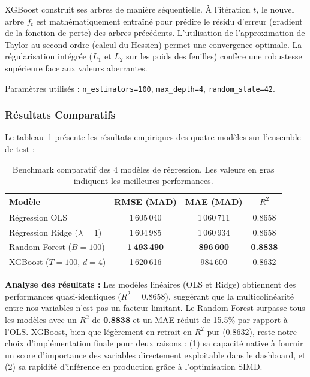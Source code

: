 \documentclass[11pt,a4paper,twoside]{report}
\begin{document}
XGBoost construit ses arbres de manière séquentielle. À l'itération $t$, le nouvel arbre $f_t$ est mathématiquement entraîné pour prédire le résidu d'erreur (gradient de la fonction de perte) des arbres précédents. L'utilisation de l'approximation de Taylor au second ordre (calcul du Hessien) permet une convergence optimale. La régularisation intégrée ($L_1$ et $L_2$ sur les poids des feuilles) confère une robustesse supérieure face aux valeurs aberrantes.

Paramètres utilisés : \texttt{n\_estimators=100}, \texttt{max\_depth=4}, \texttt{random\_state=42}.

\subsubsection{Résultats Comparatifs}

Le tableau~\ref{tab:reg_benchmark} présente les résultats empiriques des quatre modèles sur l'ensemble de test :

\begin{table}[h]
\centering
\begin{tabular}{|l|c|c|c|}
\hline
\textbf{Modèle} & \textbf{RMSE (MAD)} & \textbf{MAE (MAD)} & \textbf{$R^2$} \\ \hline
Régression OLS & 1\,605\,040 & 1\,060\,711 & 0.8658 \\ \hline
Régression Ridge ($\lambda=1$) & 1\,604\,985 & 1\,060\,934 & 0.8658 \\ \hline
Random Forest ($B=100$) & \textbf{1\,493\,490} & \textbf{896\,600} & \textbf{0.8838} \\ \hline
XGBoost ($T=100$, $d=4$) & 1\,620\,616 & 984\,600 & 0.8632 \\ \hline
\end{tabular}
\caption{Benchmark comparatif des 4 modèles de régression. Les valeurs en gras indiquent les meilleures performances.}
\label{tab:reg_benchmark}
\end{table}

\textbf{Analyse des résultats :} Les modèles linéaires (OLS et Ridge) obtiennent des performances quasi-identiques ($R^2 = 0.8658$), suggérant que la multicolinéarité entre nos variables n'est pas un facteur limitant. Le Random Forest surpasse tous les modèles avec un $R^2$ de \textbf{0.8838} et un MAE réduit de 15.5\% par rapport à l'OLS. XGBoost, bien que légèrement en retrait en $R^2$ pur (0.8632), reste notre choix d'implémentation finale pour deux raisons : (1) sa capacité native à fournir un score d'importance des variables directement exploitable dans le dashboard, et (2) sa rapidité d'inférence en production grâce à l'optimisation SIMD.
\end{document}
